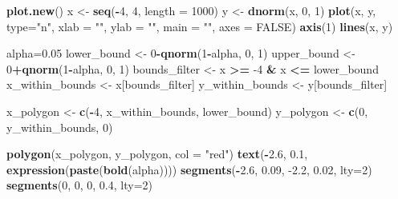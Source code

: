 \documentclass[hyperref,]{ctexart}
\newenvironment{Shaded}{\begin{snugshade}}{\end{snugshade}}
\newcommand{\DataTypeTok}[1]{\textcolor[rgb]{0.13,0.29,0.53}{#1}}
\newcommand{\DecValTok}[1]{\textcolor[rgb]{0.00,0.00,0.81}{#1}}
\newcommand{\FloatTok}[1]{\textcolor[rgb]{0.00,0.00,0.81}{#1}}
\newcommand{\KeywordTok}[1]{\textcolor[rgb]{0.13,0.29,0.53}{\textbf{#1}}}
\newcommand{\NormalTok}[1]{#1}
\newcommand{\OperatorTok}[1]{\textcolor[rgb]{0.81,0.36,0.00}{\textbf{#1}}}
\newcommand{\OtherTok}[1]{\textcolor[rgb]{0.56,0.35,0.01}{#1}}
\newcommand{\StringTok}[1]{\textcolor[rgb]{0.31,0.60,0.02}{#1}}
\begin{document}
\begin{Shaded}
\begin{Highlighting}[]
\KeywordTok{plot.new}\NormalTok{()}
\NormalTok{x <-}\StringTok{ }\KeywordTok{seq}\NormalTok{(}\OperatorTok{-}\DecValTok{4}\NormalTok{, }\DecValTok{4}\NormalTok{, }\DataTypeTok{length =} \DecValTok{1000}\NormalTok{)}
\NormalTok{y <-}\StringTok{ }\KeywordTok{dnorm}\NormalTok{(x, }\DecValTok{0}\NormalTok{, }\DecValTok{1}\NormalTok{)}
\KeywordTok{plot}\NormalTok{(x, y, }\DataTypeTok{type=}\StringTok{"n"}\NormalTok{, }\DataTypeTok{xlab =} \StringTok{""}\NormalTok{, }\DataTypeTok{ylab =} \StringTok{""}\NormalTok{, }\DataTypeTok{main =} \StringTok{""}\NormalTok{, }\DataTypeTok{axes =} \OtherTok{FALSE}\NormalTok{)}
\KeywordTok{axis}\NormalTok{(}\DecValTok{1}\NormalTok{)}
\KeywordTok{lines}\NormalTok{(x, y)}

\NormalTok{alpha=}\FloatTok{0.05}
\NormalTok{lower_bound <-}\StringTok{ }\DecValTok{0}\OperatorTok{-}\KeywordTok{qnorm}\NormalTok{(}\DecValTok{1}\OperatorTok{-}\NormalTok{alpha, }\DecValTok{0}\NormalTok{, }\DecValTok{1}\NormalTok{)}
\NormalTok{upper_bound <-}\StringTok{ }\DecValTok{0}\OperatorTok{+}\KeywordTok{qnorm}\NormalTok{(}\DecValTok{1}\OperatorTok{-}\NormalTok{alpha, }\DecValTok{0}\NormalTok{, }\DecValTok{1}\NormalTok{)}
\NormalTok{bounds_filter <-}\StringTok{ }\NormalTok{x }\OperatorTok{>=}\StringTok{ }\DecValTok{-4} \OperatorTok{&}\StringTok{ }\NormalTok{x }\OperatorTok{<=}\StringTok{ }\NormalTok{lower_bound}
\NormalTok{x_within_bounds <-}\StringTok{ }\NormalTok{x[bounds_filter]}
\NormalTok{y_within_bounds <-}\StringTok{ }\NormalTok{y[bounds_filter]}
 
\NormalTok{x_polygon <-}\StringTok{ }\KeywordTok{c}\NormalTok{(}\OperatorTok{-}\DecValTok{4}\NormalTok{, x_within_bounds, lower_bound)}
\NormalTok{y_polygon <-}\StringTok{ }\KeywordTok{c}\NormalTok{(}\DecValTok{0}\NormalTok{, y_within_bounds, }\DecValTok{0}\NormalTok{)}
 
\KeywordTok{polygon}\NormalTok{(x_polygon, y_polygon, }\DataTypeTok{col =} \StringTok{"red"}\NormalTok{)}
\KeywordTok{text}\NormalTok{(}\OperatorTok{-}\FloatTok{2.6}\NormalTok{, }\FloatTok{0.1}\NormalTok{, }\KeywordTok{expression}\NormalTok{(}\KeywordTok{paste}\NormalTok{(}\KeywordTok{bold}\NormalTok{(alpha))))}
\KeywordTok{segments}\NormalTok{(}\OperatorTok{-}\FloatTok{2.6}\NormalTok{, }\FloatTok{0.09}\NormalTok{, }\FloatTok{-2.2}\NormalTok{, }\FloatTok{0.02}\NormalTok{, }\DataTypeTok{lty=}\DecValTok{2}\NormalTok{)}
\KeywordTok{segments}\NormalTok{(}\DecValTok{0}\NormalTok{, }\DecValTok{0}\NormalTok{, }\DecValTok{0}\NormalTok{, }\FloatTok{0.4}\NormalTok{, }\DataTypeTok{lty=}\DecValTok{2}\NormalTok{)}
\end{Highlighting}
\end{Shaded}
\end{document}
